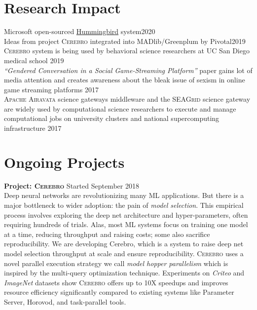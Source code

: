 \documentclass[margin]{res}
\begin{document}
\begin{resume}
\section{Research Impact}
Microsoft open-sourced \href{https://github.com/microsoft/hummingbird}{Hummingbird} system\hfill 2020\\
Ideas from project \textsc{Cerebro} integrated into MADlib/Greenplum by Pivotal\hfill 2019\\
\textsc{Cerebro} system is being used by behavioral science researchers at UC San Diego medical school \hfill 2019\\
\textit{``Gendered Conversation in a Social Game-Streaming Platform''} paper gains lot of media attention and creates awareness about the bleak issue of sexism in online game streaming platforms \hfill 2017\\
\textsc{Apache Airavata} science gateways middleware and the \textsc{SEAGrid} science gateway are widely used by computational science researchers to execute and manage computational jobs on university clusters and national supercomputing infrastructure \hfill 2017


\vspace{2mm}
\section{Ongoing Projects}
\par

\textbf{Project: \textsc{Cerebro}} \hfill Started September 2018\\
Deep neural networks are revolutionizing many ML applications.
But there is a major bottleneck to wider adoption: the pain of \textit{model selection}.
This empirical process involves exploring the deep net architecture and hyper-parameters, often requiring hundreds of trials.
Alas, most ML systems focus on training one model at a time, reducing throughput and raising costs; some also sacrifice reproducibility.
We are developing {Cerebro}, which is a system to raise deep net model selection throughput at scale and ensure reproducibility.
\textsc{Cerebro} uses a novel parallel execution strategy we call \textit{model hopper parallelism} which is inspired by the multi-query optimization technique.
Experiments on \textit{Criteo} and \textit{ImageNet} datasets show \textsc{Cerebro} offers up to 10X speedups and improves resource efficiency significantly compared to existing systems like Parameter Server, Horovod, and task-parallel tools.



\end{resume}
\end{document}
